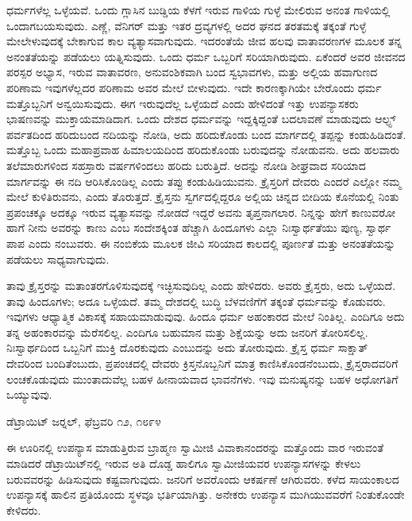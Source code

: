  ಧರ್ಮಗಳೆಲ್ಲ ಒಳ್ಳೆಯವೆ. ಒಂದು ಗ್ಲಾಸಿನ ಬುಡ್ಡಿಯ ಕೆಳಗೆ ಇರುವ ಗಾಳಿಯ ಗುಳ್ಳೆ ಮೇಲಿರುವ ಅನಂತ ಗಾಳಿಯಲ್ಲಿ ಒಂದಾಗಬಯಸುವುದು. ಎಣ್ಣೆ, ವೆನಿಗರ್ ಮತ್ತು ಇತರ ದ್ರವ್ಯಗಳಲ್ಲಿ ಅದರ ಘನದ ತರತಮಕ್ಕೆ ತಕ್ಕಂತೆ ಗುಳ್ಳೆ ಮೇಲೇಳುವುದಕ್ಕೆ ಬೇಕಾಗುವ ಕಾಲ ವ್ಯತ್ಯಾಸವಾಗುವುದು. ಇದರಂತೆಯೆ ಜೀವ ಹಲವು ವಾತಾವರಣಗಳ ಮೂಲಕ ತನ್ನ ಅನಂತತೆಯನ್ನು ಪಡೆಯಲು ಯತ್ನಿಸುವುದು. ಒಂದು ಧರ್ಮ ಒಬ್ಬರಿಗೆ ಸರಿಯಾಗಿರುವುದು. ಏಕೆಂದರೆ ಅವರ ಜೀವನದ ಪರಸ್ಪರ ಅಭ್ಯಾಸ, ಇರುವ ವಾತಾವರಣ, ಅನುವಂಶಿಕವಾಗಿ ಬಂದ ಸ್ವಭಾವಗಳು, ಮತ್ತು ಅಲ್ಲಿಯ ಹವಾಗುಣದ ಪರಿಣಾಮ ಇವುಗಳೆಲ್ಲದರ ಪರಿಣಾಮ ಅವರ ಮೇಲೆ ಬೀಳುವುದು. ಇದೇ ಕಾರಣಕ್ಕಾಗಿಯೇ ಬೇರೊಂದು ಧರ್ಮ ಮತ್ತೊಬ್ಬನಿಗೆ ಅನ್ವಯಿಸುವುದು. ಈಗ ಇರುವುದೆಲ್ಲ ಒಳ್ಳೆಯದೆ ಎಂದು ಹೇಳಿದಂತೆ ಇತ್ತು ಉಪನ್ಯಾಸಕರು ಭಾಷಣವನ್ನು ಮುಕ್ತಾಯಮಾಡಿದಾಗ. ಒಂದು ದೇಶದ ಧರ್ಮವನ್ನು ಇದ್ದಕ್ಕಿದ್ದಂತೆ ಬದಲಾವಣೆ ಮಾಡುವುದು ಆಲ್ಫ್ಸ್ ಪರ್ವತದಿಂದ ಹರಿದುಬಂದ ನದಿಯನ್ನು ನೋಡಿ, ಅದು ಹರಿದುಕೊಂಡು ಬಂದ ಮಾರ್ಗದಲ್ಲಿ ತಪ್ಪನ್ನು ಕಂಡುಹಿಡಿದಂತೆ. ಮತ್ತೊಬ್ಬ ಒಂದು ಮಹಾಪ್ರವಾಹ ಹಿಮಾಲಯದಿಂದ ಹರಿದುಕೊಂಡು ಬರುವುದನ್ನು ನೋಡುವನು. ಅದು ಹಲವಾರು ತಲೆಮಾರುಗಳಿಂದ ಸಹಸ್ರಾರು ವರ್ಷಗಳಿಂದಲು ಹರಿದು ಬರುತ್ತಿದೆ. ಅದನ್ನು ನೋಡಿ ಶೀಘ್ರವಾದ ಸರಿಯಾದ ಮಾರ್ಗವನ್ನು ಈ ನದಿ ಆರಿಸಿಕೊಂಡಿಲ್ಲ ಎಂದು ತಪ್ಪು ಕಂಡುಹಿಡಿಯುವನು. ಕ್ರೈಸ್ತರಿಗೆ ದೇವರು ಎಂದರೆ ಎಲ್ಲೋ ನಮ್ಮ ಮೇಲೆ ಕುಳಿತಿರುವನು, ಎಂದು ತೊರುತ್ತದೆ. ಕ್ರೈಸ್ತನು ಸ್ವರ್ಗದಲ್ಲಿದ್ದರೂ ಅಲ್ಲಿಯ ಚಿನ್ನದ ಬೀದಿಯ ಕೊನೆಯಲ್ಲಿ ನಿಂತು ಪ್ರಪಂಚಕ್ಕೂ ಅದಕ್ಕೂ ಇರುವ ವ್ಯತ್ಯಾಸವನ್ನು ನೋಡದೆ ಇದ್ದರೆ ಅವನು ತೃಪ್ತನಾಗಲಾರ. ನಿನ್ನನ್ನು ಹೇಗೆ ಕಾಣುವರೋ ಹಾಗೆ ನೀನು ಅವರನ್ನು ಕಾಣು ಎಂಬ ಸಂದೇಶಕ್ಕಿಂತ ಹೆಚ್ಚಾಗಿ ಹಿಂದೂಗಳು ಎಲ್ಲಾ ನಿಃಸ್ವಾರ್ಥತೆಯು ಪುಣ್ಯ, ಸ್ವಾರ್ಥ ಪಾಪ ಎಂದು ನಂಬುವರು. ಈ ನಂಬಿಕೆಯ ಮೂಲಕ ಜೀವಿ ಸರಿಯಾದ ಕಾಲದಲ್ಲಿ ಪೂರ್ಣತೆ ಮತ್ತು ಅನಂತತೆಯನ್ನು ಪಡೆಯಲು ಸಾಧ್ಯವಾಗುವುದು. 

 ತಾವು ಕ್ರೈಸ್ತರನ್ನು ಮತಾಂತರಗೊಳಿಸುವುದಕ್ಕೆ ಇಚ್ಛಿಸುವುದಿಲ್ಲ ಎಂದು ಹೇಳಿದರು. ಅವರು ಕ್ರೈಸ್ತರು, ಅದು ಒಳ್ಳೆಯದೆ. ತಾವು ಹಿಂದೂಗಳು; ಅದೂ ಒಳ್ಳೆಯದೆ. ತಮ್ಮ ದೇಶದಲ್ಲಿ ಬುದ್ಧಿ ಬೆಳವಣಿಗೆಗೆ ತಕ್ಕಂತೆ ಧರ್ಮವನ್ನು ಕೊಡುವರು. ಇವುಗಳು ಆಧ್ಯಾತ್ಮಿಕ ವಿಕಾಸಕ್ಕೆ ಸಹಾಯಮಾಡುವುವು. ಹಿಂದೂ ಧರ್ಮ ಅಹಂಕಾರದ ಮೇಲೆ ನಿಂತಿಲ್ಲ. ಎಂದಿಗೂ ಅದು ತನ್ನ ಅಹಂಕಾರವನ್ನು ಮೆರೆಸಲಿಲ್ಲ. ಎಂದಿಗೂ ಬಹುಮಾನ ಮತ್ತು ಶಿಕ್ಷೆಯನ್ನು ಅದು ಜನರಿಗೆ ತೋರಿಸಲಿಲ್ಲ. ನಿಃಸ್ವಾರ್ಥದಿಂದ ಒಬ್ಬನಿಗೆ ಮುಕ್ತಿ ದೊರಕುವುದು ಎಂಬುದನ್ನು ಅದು ತೋರುವುದು. ಕ್ರೈಸ್ತ ಧರ್ಮ ಸಾಕ್ಷಾತ್ ದೇವರಿಂದ ಬಂದಿತೆಂಬುದು, ಪ್ರಪಂಚದಲ್ಲಿ ದೇವರು ಕ್ರಿಸ್ತನೊಬ್ಬನಿಗೆ ಮಾತ್ರ ಕಾಣಿಸಿಕೊಂಡನೆಂಬುದು, ಕ್ರೈಸ್ತರಾದವರಿಗೆ ಲಂಚಕೊಡುವುದು ಮುಂತಾದುವೆಲ್ಲ ಬಹಳ ಹೀನಾಯವಾದ ಭಾವನೆಗಳು. ಇವು ಮನುಷ್ಯನನ್ನು ಬಹಳ ಅಧೋಗತಿಗೆ ಒಯ್ಯುವುವು.

\begin{flushright}
ಡೆಟ್ರಾಯಿಟ್ ಜರ‍್ನಲ್, ಫೆಬ್ರವರಿ ೧೨, ೧೮೯೪
\end{flushright}

 ಈ ಊರಿನಲ್ಲಿ ಉಪನ್ಯಾಸ ಮಾಡುತ್ತಿರುವ ಬ್ರಾಹ್ಮಣ ಸ್ವಾಮೀಜಿ ವಿವಾಕಾನಂದರನ್ನು ಮತ್ತೊಂದು ವಾರ ಇರುವಂತೆ ಮಾಡಿದರೆ ಡೆಟ್ರಾಯಿಟ್‍ನಲ್ಲಿ ಇರುವ ಅತಿ ದೊಡ್ಡ ಹಾಲಿಗೂ ಸ್ವಾಮೀಜಿಯವರ ಉಪನ್ಯಾಸಗಳನ್ನು ಕೇಳಲು ಬರುವವರನ್ನು ಹಿಡಿಸುವುದು ಕಷ್ಟವಾಗುವುದು. ಜನರಿಗೆ ಅವರೊಂದು ಆಕರ್ಷಣೆ ಆಗಿರುವರು. ಕಳೆದ ಸಾಯಂಕಾಲದ ಉಪನ್ಯಾಸಕ್ಕೆ ಹಾಲಿನ ಪ್ರತಿಯೊಂದು ಸ್ಥಳವೂ ಭರ್ತಿಯಾಗಿತ್ತು. ಅನೇಕರು ಉಪನ್ಯಾಸ ಮುಗಿಯುವವರೆಗೆ ನಿಂತುಕೊಂಡೇ ಕೇಳಿದರು. 

